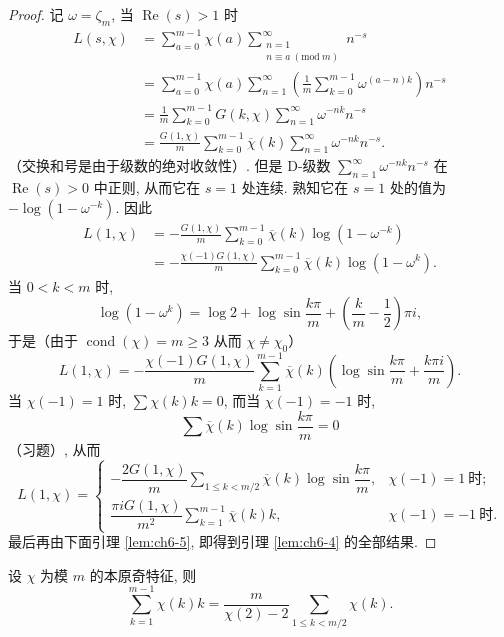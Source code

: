 \begin{proof}
记 $\omega=\zeta_m$, 当 $\operatorname{Re}(s)>1$ 时
\begin{align*}
  L(s,\chi)&=\sum_{a=0}^{m-1}\chi(a)\sum_{\substack{n=1\\ n\equiv a\ (\mathrm{mod}\ m)}}^{\infty}n^{-s}\\
  &=\sum_{a=0}^{m-1}\chi(a)\sum_{n=1}^{\infty}\left(\frac{1}{m}\sum_{k=0}^{m-1}\omega^{(a-n)k}\right)n^{-s}\\
  &=\frac{1}{m}\sum_{k=0}^{m-1}G(k,\chi)\sum_{n=1}^{\infty}\omega^{-nk}n^{-s}\\
  &=\frac{G(1,\chi)}{m}\sum_{k=0}^{m-1}\overline{\chi}(k)\sum_{n=1}^{\infty}\omega^{-nk}n^{-s}.
\end{align*}
（交换和号是由于级数的绝对收敛性）. 但是 D-级数 $\sum_{n=1}^{\infty}\omega^{-nk}n^{-s}$ 在 $\operatorname{Re}(s)>0$ 中正则, 从而它在 $s=1$ 处连续. 熟知它在 $s=1$ 处的值为 $-\log(1-\omega^{-k})$. 因此
\begin{align*}
  L(1,\chi)&=-\frac{G(1,\chi)}{m}\sum_{k=0}^{m-1}\overline{\chi}(k)\log(1-\omega^{-k})\\
  &=-\frac{\chi(-1)G(1,\chi)}{m}\sum_{k=0}^{m-1}\overline{\chi}(k)\log(1-\omega^k).
\end{align*}
当 $0<k<m$ 时,
\[
  \log(1-\omega^k)=\log 2+\log\sin\frac{k\pi}{m}+\left(\frac{k}{m}-\frac{1}{2}\right)\pi i,
\]
于是（由于 $\operatorname{cond}(\chi)=m\geqslant 3$ 从而 $\chi\neq\chi_0$）
\[
  L(1,\chi)=-\frac{\chi(-1)G(1,\chi)}{m}\sum_{k=1}^{m-1}\overline{\chi}(k)\left(\log\sin\frac{k\pi}{m}+\frac{k\pi i}{m}\right).
\]
当 $\chi(-1)=1$ 时, $\sum\chi(k)k=0$, 而当 $\chi(-1)=-1$ 时,
\[
  \sum\overline{\chi}(k)\log\sin\frac{k\pi}{m}=0
\]
（习题）, 从而
\[
  L(1,\chi)=\begin{cases}
    -\dfrac{2G(1,\chi)}{m}\sum\limits_{1\leqslant k<m/2}\overline{\chi}(k)\log\sin\dfrac{k\pi}{m}, & \chi(-1)=1\ \text{时};\\[1em]
    \dfrac{\pi iG(1,\chi)}{m^2}\sum\limits_{k=1}^{m-1}\overline{\chi}(k)k, & \chi(-1)=-1\ \text{时}.
  \end{cases}
\]
最后再由下面引理 \ref{lem:ch6-5}, 即得到引理 \ref{lem:ch6-4} 的全部结果.
\end{proof}

\begin{lemma}\label{lem:ch6-5}
设 $\chi$ 为模 $m$ 的本原奇特征, 则
\[
  \sum_{k=1}^{m-1}\chi(k)k=\frac{m}{\chi(2)-2}\sum_{1\leqslant k<m/2}\chi(k).
\]
\end{lemma}

